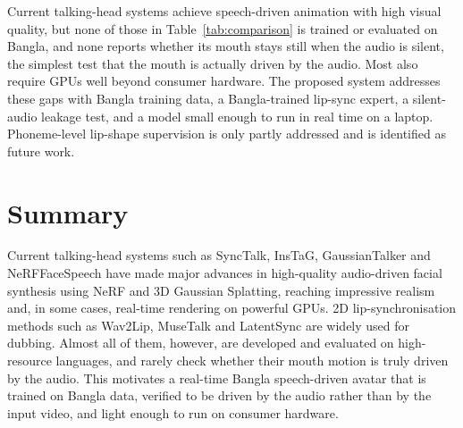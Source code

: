 \noindent
Current talking-head systems achieve speech-driven animation with high visual quality, but none of those in Table~\ref{tab:comparison} is trained or evaluated on Bangla, and none reports whether its mouth stays still when the audio is silent, the simplest test that the mouth is actually driven by the audio. Most also require GPUs well beyond consumer hardware. The proposed system addresses these gaps with Bangla training data, a Bangla-trained lip-sync expert, a silent-audio leakage test, and a model small enough to run in real time on a laptop. Phoneme-level lip-shape supervision is only partly addressed and is identified as future work.

\section{Summary}
Current talking-head systems such as SyncTalk, InsTaG, GaussianTalker and NeRFFaceSpeech have made major advances in high-quality audio-driven facial synthesis using NeRF and 3D Gaussian Splatting, reaching impressive realism and, in some cases, real-time rendering on powerful GPUs. 2D lip-synchronisation methods such as Wav2Lip, MuseTalk and LatentSync are widely used for dubbing. Almost all of them, however, are developed and evaluated on high-resource languages, and rarely check whether their mouth motion is truly driven by the audio. This motivates a real-time Bangla speech-driven avatar that is trained on Bangla data, verified to be driven by the audio rather than by the input video, and light enough to run on consumer hardware.\\
